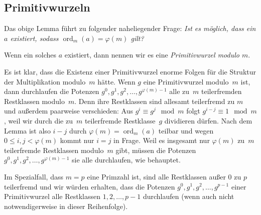 \subsection*{Primitivwurzeln}
Das obige Lemma führt zu folgender naheliegender Frage: \emph{Ist es möglich, dass ein $a$ existiert, sodass $\operatorname{ord}_m(a)=\varphi(m)$ gilt?}

\begin{definition}
	Wenn ein solches $a$ existiert, dann nennen wir es eine \emph{Primitivwurzel modulo $m$}.
\end{definition}
Es ist klar, dass die Existenz einer Primitivwurzel enorme Folgen für die Struktur der Multiplikation modulo~$m$ hätte. Wenn $g$ eine Primitivwurzel modulo~$m$ ist, dann durchlaufen die Potenzen $g^0,g^1,g^2,\dotsc,g^{\varphi(m)-1}$ alle zu~$m$ teilerfremden Restklassen modulo~$m$. Denn ihre Restklassen sind allesamt teilerfremd zu $m$ und außerdem paarweise verschieden: Aus $g^i\equiv g^j\mod m$ folgt $g^{i-j}\equiv 1\mod m$, weil wir durch die zu~$m$ teilerfremde Restklasse~$g$ dividieren dürfen. Nach dem Lemma ist also $i-j$ durch $\varphi(m)=\operatorname{ord}_m(a)$ teilbar und wegen $0\leqslant i,j<\varphi(m)$ kommt nur $i=j$ in Frage. Weil es insgesamt nur $\varphi(m)$ zu~$m$ teilerfremde Restklassen modulo~$m$ gibt, müssen die Potenzen $g^0,g^1,g^2,\dotsc,g^{\varphi(m)-1}$ sie alle durchlaufen, wie behauptet.

Im Spezialfall, dass $m=p$ eine Primzahl ist, sind alle Restklassen außer $0$ zu $p$ teilerfremd und wir würden erhalten, dass die Potenzen $g^0,g^1,g^2,\dotsc,g^{p-1}$ einer Primitivwurzel alle Restklassen $1,2,\dotsc,p-1$ durchlaufen (wenn auch nicht notwendigerweise in dieser Reihenfolge).

